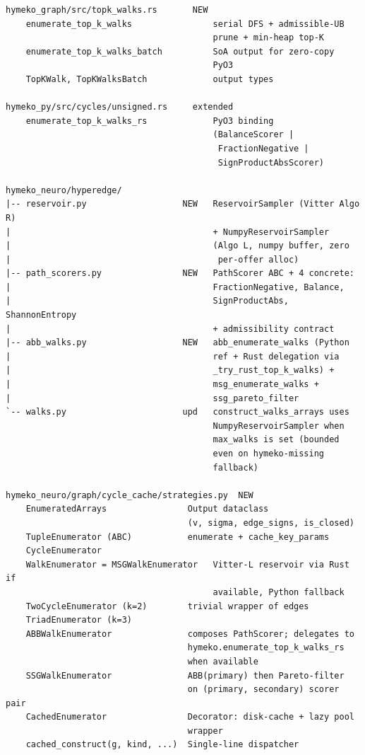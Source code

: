 \documentclass[11pt]{article}
\begin{document}
\begin{lstlisting}
hymeko_graph/src/topk_walks.rs       NEW
    enumerate_top_k_walks                serial DFS + admissible-UB
                                         prune + min-heap top-K
    enumerate_top_k_walks_batch          SoA output for zero-copy
                                         PyO3
    TopKWalk, TopKWalksBatch             output types

hymeko_py/src/cycles/unsigned.rs     extended
    enumerate_top_k_walks_rs             PyO3 binding
                                         (BalanceScorer |
                                          FractionNegative |
                                          SignProductAbsScorer)

hymeko_neuro/hyperedge/
|-- reservoir.py                   NEW   ReservoirSampler (Vitter Algo R)
|                                        + NumpyReservoirSampler
|                                        (Algo L, numpy buffer, zero
|                                         per-offer alloc)
|-- path_scorers.py                NEW   PathScorer ABC + 4 concrete:
|                                        FractionNegative, Balance,
|                                        SignProductAbs, ShannonEntropy
|                                        + admissibility contract
|-- abb_walks.py                   NEW   abb_enumerate_walks (Python
|                                        ref + Rust delegation via
|                                        _try_rust_top_k_walks) +
|                                        msg_enumerate_walks +
|                                        ssg_pareto_filter
`-- walks.py                       upd   construct_walks_arrays uses
                                         NumpyReservoirSampler when
                                         max_walks is set (bounded
                                         even on hymeko-missing
                                         fallback)

hymeko_neuro/graph/cycle_cache/strategies.py  NEW
    EnumeratedArrays                Output dataclass
                                    (v, sigma, edge_signs, is_closed)
    TupleEnumerator (ABC)           enumerate + cache_key_params
    CycleEnumerator
    WalkEnumerator = MSGWalkEnumerator   Vitter-L reservoir via Rust if
                                         available, Python fallback
    TwoCycleEnumerator (k=2)        trivial wrapper of edges
    TriadEnumerator (k=3)
    ABBWalkEnumerator               composes PathScorer; delegates to
                                    hymeko.enumerate_top_k_walks_rs
                                    when available
    SSGWalkEnumerator               ABB(primary) then Pareto-filter
                                    on (primary, secondary) scorer pair
    CachedEnumerator                Decorator: disk-cache + lazy pool
                                    wrapper
    cached_construct(g, kind, ...)  Single-line dispatcher
\end{lstlisting}
\end{document}
